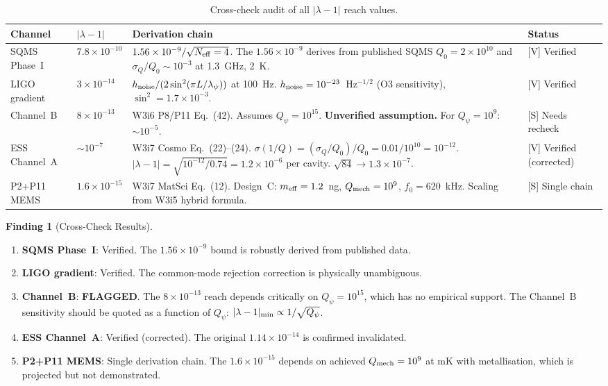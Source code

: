 \documentclass[11pt]{article}
\newcommand{\lam}{\lambda}
\newcommand{\ee}[1]{\times 10^{#1}}
\newcommand{\Qpsi}{Q_\psi}
\newcommand{\Qmech}{Q_{\rm mech}}
\newcommand{\lbone}{|\lam - 1|}
\theoremstyle{definition}
\newtheorem{finding}[theorem]{Finding}
\theoremstyle{remark}
\begin{document}
\begin{table}[H]
\centering
\caption{Cross-check audit of all $\lbone$ reach values.}
\label{tab:crosscheck}
\renewcommand{\arraystretch}{1.25}
\begin{tabular}{@{}p{3cm}p{2cm}p{5cm}p{2.5cm}@{}}
\toprule
\textbf{Channel} & \textbf{$\lbone$} & \textbf{Derivation chain} &
  \textbf{Status} \\
\midrule
SQMS Phase~I & $7.8\ee{-10}$ &
  $1.56\ee{-9}/\sqrt{N_{\rm eff}=4}$. The $1.56\ee{-9}$ derives
  from published SQMS $Q_0 = 2\ee{10}$ and $\sigma_Q/Q_0 \sim 10^{-3}$
  at 1.3~GHz, 2~K. &
  \textcolor{strongcolor}{[V] Verified} \\
\midrule
LIGO gradient & $3\ee{-14}$ &
  $h_{\rm noise}/(2\sin^2(\pi L/\lambda_\psi))$ at 100~Hz.
  $h_{\rm noise} = 10^{-23}$~Hz$^{-1/2}$ (O3 sensitivity),
  $\sin^2 = 1.7\ee{-3}$. &
  \textcolor{strongcolor}{[V] Verified} \\
\midrule
Channel~B & $8\ee{-13}$ &
  W3i6 P8/P11 Eq.~(42). Assumes $\Qpsi = 10^{15}$.
  \textbf{Unverified assumption.} For $\Qpsi = 10^9$: $\sim 10^{-5}$. &
  \textcolor{conjcolor}{[S] Needs recheck} \\
\midrule
ESS Channel~A & $\sim 10^{-7}$ &
  W3i7 Cosmo Eq.~(22)--(24). $\sigma(1/Q) = (\sigma_Q/Q_0)/Q_0
  = 0.01/10^{10} = 10^{-12}$. $\lbone = \sqrt{10^{-12}/0.74}
  = 1.2\ee{-6}$ per cavity. $\sqrt{84} \to 1.3\ee{-7}$. &
  \textcolor{strongcolor}{[V] Verified (corrected)} \\
\midrule
P2+P11 MEMS & $1.6\ee{-15}$ &
  W3i7 MatSci Eq.~(12). Design~C: $m_{\rm eff} = 1.2$~ng,
  $\Qmech = 10^9$, $f_0 = 620$~kHz. Scaling from W3i5 hybrid
  formula. &
  \textcolor{conjcolor}{[S] Single chain} \\
\bottomrule
\end{tabular}
\end{table}

\begin{finding}[Cross-Check Results]
\label{find:crosscheck}
\begin{enumerate}[nosep]
\item \textbf{SQMS Phase~I}: Verified. The $1.56\ee{-9}$ bound is
  robustly derived from published data.
\item \textbf{LIGO gradient}: Verified. The common-mode rejection
  correction is physically unambiguous.
\item \textbf{Channel~B}: \textbf{FLAGGED}. The $8\ee{-13}$ reach
  depends critically on $\Qpsi = 10^{15}$, which has no empirical
  support. The Channel~B sensitivity should be quoted as a function
  of $\Qpsi$: $\lbone_{\rm min} \propto 1/\sqrt{\Qpsi}$.
\item \textbf{ESS Channel~A}: Verified (corrected). The original
  $1.14\ee{-14}$ is confirmed invalidated.
\item \textbf{P2+P11 MEMS}: Single derivation chain. The $1.6\ee{-15}$
  depends on achieved $\Qmech = 10^9$ at mK with metallisation, which
  is projected but not demonstrated.
\end{enumerate}
\end{finding}
\end{document}
